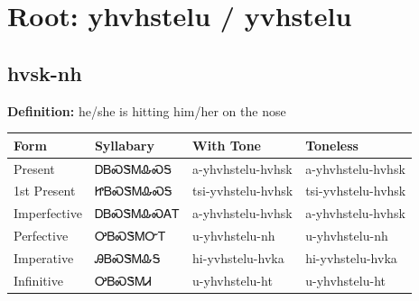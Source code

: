 \documentclass{article}%
\begin{document}
%
\normalsize%
\section*{Root: yhvhstelu / yvhstelu}%
\subsection*{hvsk-nh}%
\textbf{Definition: }%
he/she is hitting him/her on the nose%
\\[0.5em]%
\begin{tabular}{|l|l|l|l|}%
\hline%
\textbf{Form}&\textbf{Syllabary}&\textbf{With Tone}&\textbf{Toneless}\\%
\hline%
Present&ᎠᏴᏍᏕᎷᎲᏍᎦ&a{-}yhvhstelu{-}hvhsk&a{-}yhvhstelu{-}hvhsk\\%
1st Present&ᏥᏴᏍᏕᎷᎲᏍᎦ&tsi{-}yvhstelu{-}hvhsk&tsi{-}yvhstelu{-}hvhsk\\%
Imperfective&ᎠᏴᏍᏕᎷᎲᏍᎪᎢ&a{-}yhvhstelu{-}hvhsk&a{-}yhvhstelu{-}hvhsk\\%
Perfective&ᎤᏴᏍᏕᎷᏅᎢ&u{-}yhvhstelu{-}nh&u{-}yhvhstelu{-}nh\\%
Imperative&ᎯᏴᏍᏕᎷᎲᎦ&hi{-}yvhstelu{-}hvka&hi{-}yvhstelu{-}hvka\\%
Infinitive&ᎤᏴᏍᏕᎷᏗ&u{-}yhvhstelu{-}ht&u{-}yhvhstelu{-}ht\\%
\hline%
\end{tabular}%
\\[1em]%
\end{document}
